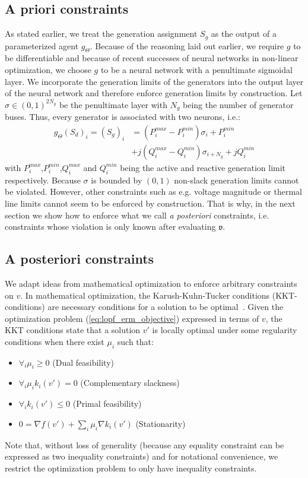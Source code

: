 \subsection{A priori constraints}
As stated earlier, we treat the generation assignment $S_g$ as the output of a parameterized agent $g_\Theta$. Because of the reasoning laid out earlier, we require $g$ to be differentiable and because of recent successes of neural networks in non-linear optimization, we choose $g$ to be a neural network with a penultimate sigmoidal layer. We incorporate the generation limits of the generators into the output layer of the neural network and therefore enforce generation limits by construction. Let $\sigma \in (0,1)^{2N_g}$ be the penultimate layer with $N_g$ being the number of generator buses. Thus, every generator is associated with two neurons, i.e.:
\begin{align*}
g_\Theta(S_d)_i = (S_g)_i &= (P_i^{max} - P_i^{min})\sigma_i + P_i^{min}\\
 &+ j(Q_i^{max} - Q_i^{min})\sigma_{i+N_g}  + jQ_i^{min}
\end{align*}
with $P^{max}_i$,$P^{min}_i$,$Q_i^{max}$ and $Q_i^{min}$ being the active and reactive generation limit respectively. Because $\sigma$ is bounded by $(0,1)$ non-slack generation limits cannot be violated. However, other constraints such as e.g. voltage magnitude or thermal line limits cannot seem to be enforced by construction. That is why, in the next section we show how to enforce what we call \emph{a posteriori} constraints, i.e. constraints whose violation is only known after evaluating $\mathfrak{v}$.


\subsection{A posteriori constraints}
We adapt ideas from mathematical optimization to enforce arbitrary constraints on $v$. In mathematical optimization, the Karush-Kuhn-Tucker conditions (KKT-conditions) are necessary conditions for a solution to be optimal~\cite{gordon2012karush}. Given the optimization problem (\ref{eq:lopf_erm_objective}) expressed in terms of $v$, the KKT conditions state that a solution $v'$ is locally optimal under some regularity conditions when there exist $\mu_i$ such that:
\begin{itemize}
\item $\forall_i \mu_i \geq 0$ (Dual feasibility)
\item $\forall_i \mu_i k_i(v') = 0$ (Complementary slackness)
\item $\forall_i k_i(v') \leq 0$ (Primal feasibility)
\item $0 =\nabla f(v') + \sum_i \mu_i \nabla k_i(v')$ (Stationarity)
\end{itemize}
Note that, without loss of generality (because any equality constraint can be expressed as two inequality constraints) and for notational convenience, we restrict the optimization problem to only have inequality constraints.

